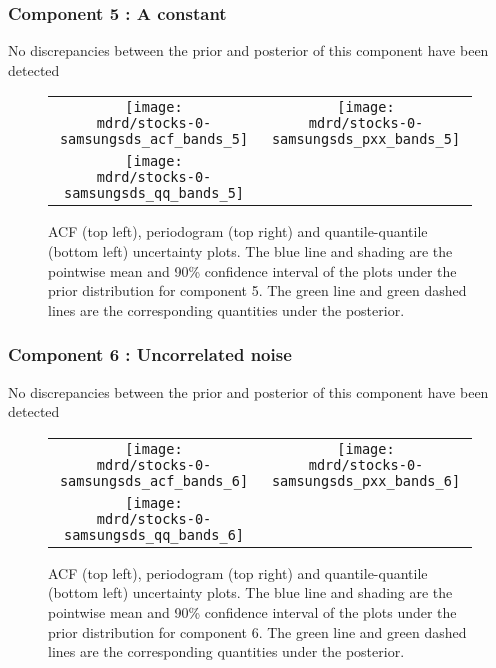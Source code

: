 \documentclass{article} %
\begin{document}
\subsubsection{Component 5 : A constant}

No discrepancies between the prior and posterior of this component have been detected

\begin{figure}[H]
\newcommand{\wmgd}{0.5\columnwidth}
\newcommand{\hmgd}{3.0cm}
\newcommand{\mdrd}{stocks-0-samsungsds}
\newcommand{\mbm}{\hspace{-0.3cm}}
\begin{tabular}{cc}
\mbm \texttt{[image: \\mdrd/stocks-0-samsungsds\_acf\_bands\_5]} & \texttt{[image: \\mdrd/stocks-0-samsungsds\_pxx\_bands\_5]} \\
\mbm \texttt{[image: \\mdrd/stocks-0-samsungsds\_qq\_bands\_5]}
\end{tabular}
\caption{
ACF (top left), periodogram (top right) and quantile-quantile (bottom left) uncertainty plots.
The blue line and shading are the pointwise mean and 90\% confidence interval of the plots under the prior distribution for component 5.
The green line and green dashed lines are the corresponding quantities under the posterior.}
\label{fig:check5}
\end{figure}

\subsubsection{Component 6 : Uncorrelated noise}

No discrepancies between the prior and posterior of this component have been detected

\begin{figure}[H]
\newcommand{\wmgd}{0.5\columnwidth}
\newcommand{\hmgd}{3.0cm}
\newcommand{\mdrd}{stocks-0-samsungsds}
\newcommand{\mbm}{\hspace{-0.3cm}}
\begin{tabular}{cc}
\mbm \texttt{[image: \\mdrd/stocks-0-samsungsds\_acf\_bands\_6]} & \texttt{[image: \\mdrd/stocks-0-samsungsds\_pxx\_bands\_6]} \\
\mbm \texttt{[image: \\mdrd/stocks-0-samsungsds\_qq\_bands\_6]}
\end{tabular}
\caption{
ACF (top left), periodogram (top right) and quantile-quantile (bottom left) uncertainty plots.
The blue line and shading are the pointwise mean and 90\% confidence interval of the plots under the prior distribution for component 6.
The green line and green dashed lines are the corresponding quantities under the posterior.}
\label{fig:check6}
\end{figure}
\end{document}
